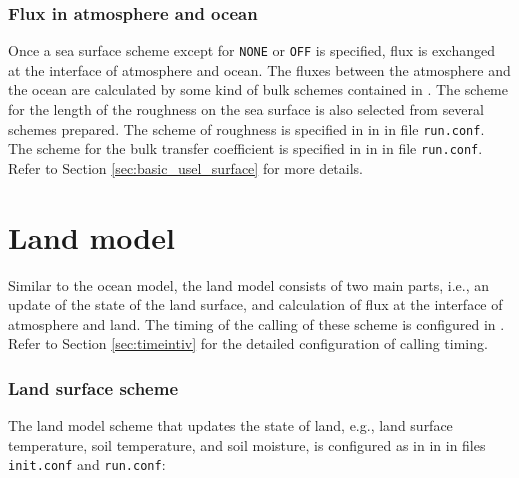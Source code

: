 \subsubsection{Flux in atmosphere and ocean}
Once a sea surface scheme except for \verb|NONE| or \verb|OFF| is specified, flux is exchanged at the interface of atmosphere and ocean. The fluxes between the atmosphere and the ocean are calculated by some kind of bulk schemes contained in \scalerm. The scheme for the length of the roughness on the sea surface is also selected from several schemes prepared. The scheme of roughness is specified in  in  in file \verb|run.conf|. The scheme for the bulk transfer coefficient is specified in  in  in file \verb|run.conf|. Refer to Section \ref{sec:basic_usel_surface} for more details.


\section{Land model} \label{sec:basic_usel_land}
Similar to the ocean model, the land model consists of two main parts, i.e., an update of the state of the land surface, and calculation of flux at the interface of atmosphere and land. The timing of the calling of these scheme is configured in . Refer to Section \ref{sec:timeintiv} for the detailed configuration of calling timing.

\subsubsection{Land surface scheme}
The land model scheme that updates the state of land, e.g., land surface temperature, soil temperature, and soil moisture, is configured as in  in  in files \verb|init.conf| and \verb|run.conf|:

